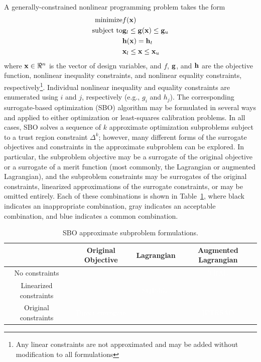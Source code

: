 A generally-constrained nonlinear programming problem takes the form
\begin{eqnarray}
{\rm minimize } \hfil & f({\bf x}) \nonumber \\
{\rm subject\  to } & {\bf g}_l \le {\bf g}({\bf x}) \le {\bf g}_u \nonumber \\
		    &               {\bf h}({\bf x}) = {\bf h}_t \nonumber \\
		    & {\bf x}_l \le {\bf x} \le {\bf x}_u
\label{eq:NLP_standard}
\end{eqnarray}
where ${\bf x} \in \Re^n$ is the vector of design variables, and $f$,
${\bf g}$, and ${\bf h}$ are the objective function, nonlinear
inequality constraints, and nonlinear equality constraints,
respectively\footnote{Any linear constraints are not approximated and
may be added without modification to all formulations}.  Individual
nonlinear inequality and equality constraints are enumerated using $i$
and $j$, respectively (e.g., $g_i$ and $h_j$).  The corresponding
surrogate-based optimization (SBO) algorithm may be formulated in
several ways and applied to either optimization or least-squares
calibration problems. In all cases, SBO solves a sequence of $k$
approximate optimization subproblems subject to a trust region
constraint $\Delta^k$; however, many different forms of the surrogate
objectives and constraints in the approximate subproblem can be
explored.  In particular, the subproblem objective may be a surrogate
of the original objective or a surrogate of a merit function (most
commonly, the Lagrangian or augmented Lagrangian), and the subproblem
constraints may be surrogates of the original constraints, linearized
approximations of the surrogate constraints, or may be omitted
entirely.  Each of these combinations is shown in
Table~\ref{tab:sbo_subprob}, where black indicates an inappropriate
combination, gray indicates an acceptable combination, and blue
indicates a common combination.
\begin{table}
\centering
\caption{SBO approximate subproblem formulations.} \label{tab:sbo_subprob}
\begin{tabular}{c|c|c|c|}
       & Original Objective & Lagrangian & Augmented Lagrangian \\
\hline
No constraints         & \cellcolor{black}\phantom{Original Objective}
                       & \cellcolor[gray]{0.5} \phantom{Original Objective}
                       & \cellcolor{blue}\textcolor{white}{TRAL} \\
\hline
Linearized constraints & \cellcolor[gray]{0.5}
                       & \cellcolor{blue}\textcolor{white}{SQP-like}
                       & \cellcolor[gray]{0.5} \\
\hline
Original constraints   & \cellcolor{blue}\textcolor{white}{Direct surrogate}
                       & \cellcolor[gray]{0.5}
                       & \cellcolor{blue}\textcolor{white}{IPTRSAO} \\
\hline
\end{tabular}
\end{table}

